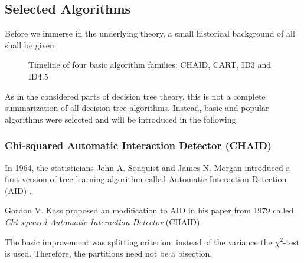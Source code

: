 \subsection{Selected Algorithms}\label{selectedalgorithms}

Before we immerse in the underlying theory, a small historical background of all shall be given. 

\begin{figure}[!h]
\caption{Timeline of four basic algorithm families: \textsf{CHAID}, CART, ID3 and ID4.5}
\label{}
\end{figure}


\begin{remark}
    As in the considered parts of decision tree theory, this is not a complete summarization of all decision tree algorithms. Instead, basic and popular algorithms were selected and will be introduced in the following. 
\end{remark}




\subsubsection{Chi-squared Automatic Interaction Detector (CHAID)} 

In 1964, the statisticians John A. Sonquist and James N. Morgan introduced a first version of tree learning algorithm called Automatic Interaction Detection (AID) \cite{morgan1963problems}. 

Gordon V. Kass proposed an modification to AID in his paper from 1979 \cite{kass1980exploratory} called \textit{Chi-squared Automatic Interaction Detector} (CHAID). 

The basic improvement was splitting criterion: instead of the variance the $\chi^2$-test is used. Therefore, the partitions need not be a bisection.

